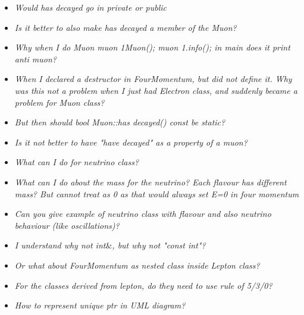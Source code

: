 \documentclass[11pt, letterpaper]{article}
\begin{document}
\begin{itemize}
	\item \textit{Would has decayed go in private or public}
	\item \textit{Is it better to also make has decayed a member of the Muon?}
	\item \textit{Why when I do Muon muon 1{Muon()}; muon 1.info(); in main does it print anti muon?}
	\item \textit{When I declared a destructor in FourMomentum, but did not define it. Why was this not a problem when I just had Electron class, and suddenly became a problem for Muon class?}
	\item \textit{But then should bool Muon::has decayed() const be static?}
	\item \textit{Is it not better to have "have decayed" as a property of a muon?}
	\item \textit{What can I do for neutrino class?}
	\item \textit{What can I do about the mass for the neutrino? Each flavour has different mass? But cannot treat as 0 as that would always set E=0 in four momentum}
	\item \textit{Can you give example of neutrino class with flavour and also neutrino behaviour (like oscillations)?}
	\item \textit{I understand why not int$\&$, but why not "const int"?}
	\item \textit{Or what about FourMomentum as nested class inside Lepton class?}
	\item \textit{For the classes derived from lepton, do they need to use rule of 5/3/0?}
	\item \textit{How to represent unique ptr in UML diagram?}
\end{itemize}
\end{document}
